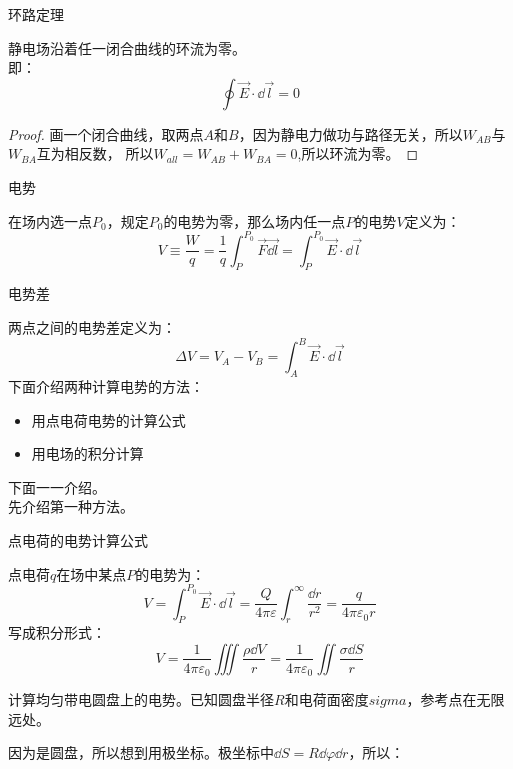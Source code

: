\documentclass[cn,hazy,blue,14pt,normal]{elegantnote}
\numberwithin{equation}{section}
\begin{document}
\begin{theorem}
    环路定理
\end{theorem}
静电场沿着任一闭合曲线的环流为零。\\
即：
\begin{equation}\label{环路定理}
\oint\vec{E}\cdot\dd\vec{l}=0
\end{equation}
\begin{proof}
    画一个闭合曲线，取两点$A$和$B$，因为静电力做功与路径无关，所以$W_{AB}$与$W_{BA}$互为相反数，
    所以$W_{all}=W_{AB}+W_{BA}=0$,所以环流为零。
\end{proof}
\begin{definition}
    电势
\end{definition}
在场内选一点$P_0$，规定$P_0$的电势为零，那么场内任一点$P$的电势$V$定义为：
\begin{equation}\label{电势}
V \equiv \frac{W}{q} = \frac 1q\int_{P}^{P_0}\vec{F}\vec{\dd l} = \int_{P}^{P_0}\vec{E}\cdot\dd\vec{l}
\end{equation}
\begin{definition}
    电势差
\end{definition}
两点之间的电势差定义为：
\begin{equation}
	\Delta V = V_A - V_B = \int_{A}^{B}\vec{E}\cdot\dd\vec{l}
\end{equation}
下面介绍两种计算电势的方法：
\begin{itemize}
    \item 用点电荷电势的计算公式
    \item 用电场的积分计算
\end{itemize}
下面一一介绍。\\
先介绍第一种方法。
\begin{theorem}
    点电荷的电势计算公式
\end{theorem}
点电荷$q$在场中某点$P$的电势为：
\begin{equation}
V =\int_{P}^{P_0}\vec{E}\cdot\dd\vec{l} = \frac{Q}{4\pi\varepsilon}\int_{r}^{\infty}\frac{\dd r}{r^2} = \frac{q}{4\pi\varepsilon_0r}
\end{equation}
写成积分形式：
\begin{equation}\label{点电荷电势}
V = \frac{1}{4\pi\varepsilon_0}\iiint\frac{\rho\dd V}{r} = \frac{1}{4\pi\varepsilon_0}\iint\frac{\sigma\dd S}{r}
\end{equation}
\begin{example}
    计算均匀带电圆盘上的电势。已知圆盘半径$R$和电荷面密度$sigma$，参考点在无限远处。
\end{example}
因为是圆盘，所以想到用极坐标。极坐标中$\dd S = R\dd\varphi\dd r$，所以：
\end{document}
